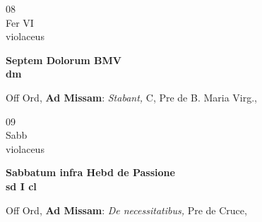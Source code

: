 \documentclass[10pt, openany]{book}
\begin{document}
        \begin{center}
            \begin{minipage}{3.5in}
                \vspace{2em}
                \begin{minipage}{0.5in}
                    {\Huge 08} \\
                    {\normalsize Fer VI} \\
                    {\normalsize violaceus}
                \end{minipage}
                \begin{minipage}{3.0in}
                    \textbf{ \large Septem Dolorum BMV \\
                    \textnormal{\normalsize dm}} \\ 
                \end{minipage}
                \begin{justify}Off Ord, \textbf{Ad Missam}: \textit{Stabant,} C, Pre de B. Maria Virg.,  
                \end{justify}
            \end{minipage}
        \end{center}
    
        \begin{center}
            \begin{minipage}{3.5in}
                \vspace{2em}
                \begin{minipage}{0.5in}
                    {\Huge 09} \\
                    {\normalsize Sabb} \\
                    {\normalsize violaceus}
                \end{minipage}
                \begin{minipage}{3.0in}
                    \textbf{ \large Sabbatum infra Hebd de Passione \\
                    \textnormal{\normalsize sd I cl}} \\ 
                \end{minipage}
                \begin{justify}Off Ord, \textbf{Ad Missam}: \textit{De necessitatibus,} Pre de Cruce,  
                \end{justify}
            \end{minipage}
        \end{center}
    
\end{document}

